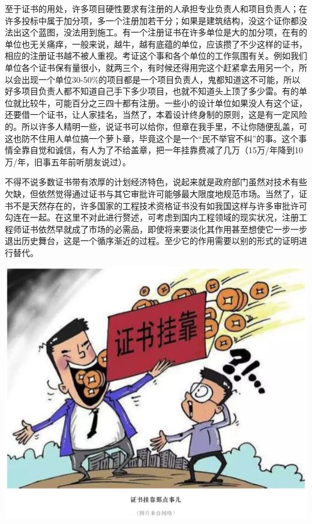 \documentclass[]{book}
\begin{document}
至于证书的用处，许多项目硬性要求有注册的人承担专业负责人和项目负责人；在许多投标中属于加分项，多一个注册加若干分；如果是建筑结构，没这个证你都没法出这个蓝图，没法用到施工。有一个注册证书在许多单位是大的加分项，在有的单位也无关痛痒，一般来说，越牛，越有底蕴的单位，应该攒了不少这样的证书，相应的注册证书越不被人重视。考证这个事和各个单位的工作氛围有关。例如我们单位各个证书保有量很小，就两三个，有时候还得用完这个赶紧拿去用另一个，所以会出现一个单位30-50\%的项目都是一个项目负责人，鬼都知道这不可能，所以好多项目负责人都不知道自己手下多少项目，也就不知道头上顶了多少雷。有的单位就比较牛，可能百分之三四十都有注册。一些小的设计单位如果没人有这个证，还要借一个证书，让人家挂名，当然了，本着设计终身制的原则，这是有一定风险的。所以许多人精明一些，说证书可以给你，但章在我手里，不让你随便乱盖，可这也防不住用人单位搞一个萝卜章，毕竟这个是一个``民不举官不纠''的事。这个事情全靠自觉和诚信，有人为了不给盖章，把一年挂靠费减了几万（15万/年降到10万/年，旧事五年前听朋友说过）。

不得不说多数证书带有浓厚的计划经济特色，说起来就是政府部门虽然对技术有些欠缺，但依然觉得通过证书与其它审批许可能够最大限度地规范市场。当然了，证书不是天然存在的，许多国家的工程技术资格证书没有如我国这样与许多审批许可勾连在一起。在这里不对此进行赘述，可考虑到国内工程领域的现实状况，注册工程师证书依然早就成了市场的必需品，即使将来要淡化其作用甚至想使它一步一步退出历史舞台，这是一个循序渐近的过程。至少它的作用需要以别的形式的证明进行替代。

\includegraphics[width=8.33in]{images/kaozheng5}
\end{document}
